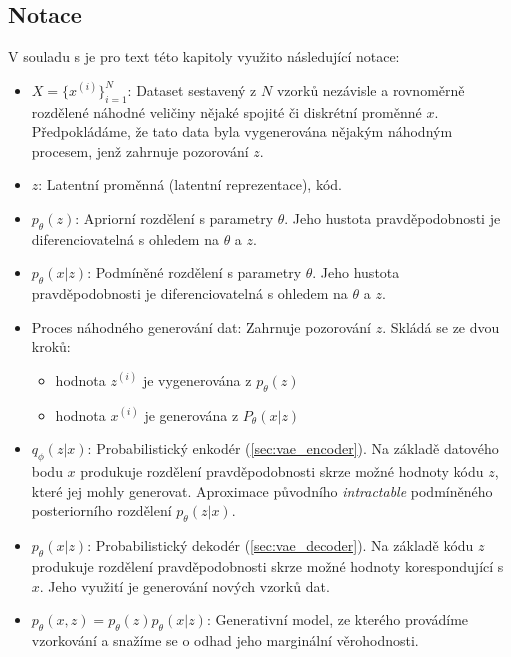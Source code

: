 \subsection{Notace}
V souladu s \textcite{Kingma2019} je pro text této kapitoly využito následující notace:
\begin{itemize}
    \item $X = \{ x^{(i)} \}^N_{i=1}$: Dataset sestavený z $N$ vzorků nezávisle a rovnoměrně rozdělené náhodné veličiny nějaké spojité či diskrétní proměnné $x$. 
    Předpokládáme, že tato data byla vygenerována nějakým náhodným procesem, jenž zahrnuje pozorování $z$.
    \item $z$: Latentní proměnná (latentní reprezentace), kód.
    \item $p_\theta(z)$: Apriorní rozdělení s parametry $\theta$. Jeho hustota pravděpodobnosti je diferenciovatelná s ohledem na $\theta$ a $z$.
    \item $p_\theta(x|z)$: Podmíněné rozdělení s parametry $\theta$. Jeho hustota pravděpodobnosti je diferenciovatelná s ohledem na $\theta$ a $z$.
    \item Proces náhodného generování dat: Zahrnuje pozorování $z$. Skládá se ze dvou kroků: 
    \begin{itemize}
        \item hodnota $z^{(i)}$ je vygenerována z $p_\theta(z)$
        \item hodnota $x^{(i)}$ je generována z $P_\theta(x|z)$
    \end{itemize}
    \item $q_\phi(z|x)$: Probabilistický enkodér (\autoref{sec:vae_encoder}). Na základě datového bodu $x$ produkuje rozdělení pravděpodobnosti skrze možné hodnoty kódu $z$, které jej mohly generovat. Aproximace původního \emph{intractable} podmíněného posteriorního rozdělení $p_\theta(z|x)$.
    \item $p_\theta(x|z)$: Probabilistický dekodér (\autoref{sec:vae_decoder}). Na základě kódu $z$ produkuje rozdělení pravděpodobnosti skrze možné hodnoty korespondující s $x$. Jeho využití je generování nových vzorků dat. 
    \item $p_\theta(x, z) = p_\theta(z) p_\theta(x|z)$: Generativní model, ze kterého provádíme vzorkování a snažíme se o odhad jeho marginální věrohodnosti.
\end{itemize}
